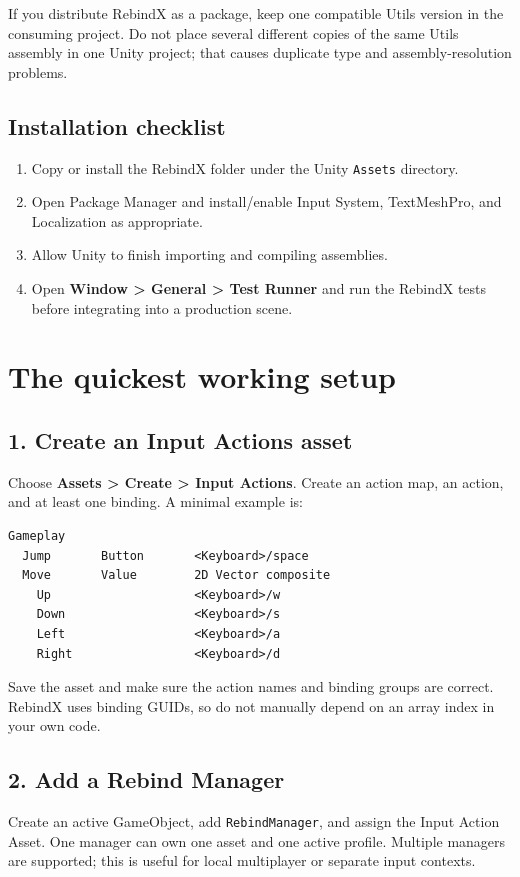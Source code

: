 \documentclass[11pt,a4paper]{article}
\newcommand{\class}[1]{\texttt{#1}}
\newcommand{\pathref}[1]{\texttt{#1}}
\begin{document}
If you distribute RebindX as a package, keep one compatible Utils version in the consuming project. Do not place several different copies of the same Utils assembly in one Unity project; that causes duplicate type and assembly-resolution problems.

\subsection{Installation checklist}
\begin{enumerate}
  \item Copy or install the RebindX folder under the Unity \pathref{Assets} directory.
  \item Open Package Manager and install/enable Input System, TextMeshPro, and Localization as appropriate.
  \item Allow Unity to finish importing and compiling assemblies.
  \item Open \textbf{Window > General > Test Runner} and run the RebindX tests before integrating into a production scene.
\end{enumerate}

\section{The quickest working setup}
\subsection{1. Create an Input Actions asset}
Choose \textbf{Assets > Create > Input Actions}. Create an action map, an action, and at least one binding. A minimal example is:
\begin{lstlisting}[style=plain]
Gameplay
  Jump       Button       <Keyboard>/space
  Move       Value        2D Vector composite
    Up                    <Keyboard>/w
    Down                  <Keyboard>/s
    Left                  <Keyboard>/a
    Right                 <Keyboard>/d
\end{lstlisting}
Save the asset and make sure the action names and binding groups are correct. RebindX uses binding GUIDs, so do not manually depend on an array index in your own code.

\subsection{2. Add a Rebind Manager}
Create an active GameObject, add \class{RebindManager}, and assign the Input Action Asset. One manager can own one asset and one active profile. Multiple managers are supported; this is useful for local multiplayer or separate input contexts.
\end{document}
